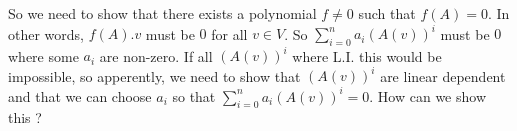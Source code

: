 So we need to show that there exists a polynomial $f \neq 0$ such that $f(A) = 0$. In other words, $f(A).v$ must be $0$ for all $v\in V$. So $\sum_{i=0}^n a_i (A(v))^i$ must be $0$ where some $a_i$ are non-zero. If all $(A(v))^i$ where L.I. this would be impossible, so apperently, we need to show that $(A(v))^i$ are linear dependent and that we can choose $a_i$ so that $\sum_{i=0}^n a_i (A(v))^i=0$. How can we show this ?
